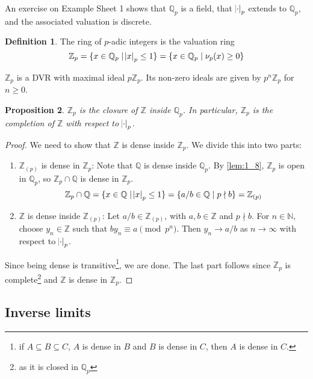 \documentclass[12pt]{amsart}
\theoremstyle{definition}
\newtheorem{definition}{Definition}[section]
\theoremstyle{plain}
\newtheorem{proposition}[definition]{Proposition}
\theoremstyle{remark}
\newcommand{\bN}{\mathbb{N}}
\newcommand{\bZ}{\mathbb{Z}}
\newcommand{\bQ}{\mathbb{Q}}
\begin{document}
An exercise on Example Sheet 1 shows that $\bQ_p$ is a field, that $\abs{\cdot}_p$ extends to $\bQ_p$, and the associated valuation is discrete.

\begin{definition}
    The ring of $p$-adic integers is the valuation ring
    \begin{equation*}
        \bZ_p = \{x \in \bQ_p \mid \abs{x}_p \le 1\} = \{x \in \bQ_p \mid \nu_p(x) \ge 0\}
    \end{equation*}
\end{definition}

\noindent $\bZ_p$ is a DVR with maximal ideal $p \bZ_p$. Its non-zero ideals are given by $p^n \bZ_p$ for $n \ge 0$.

\begin{proposition}\label{prop:3_2}
    $\bZ_p$ is the closure of $\bZ$ inside $\bQ_p$. In particular, $\bZ_p$ is the completion of $\bZ$ with respect to $\abs{\cdot}_p$.
\end{proposition}
\begin{proof}
    We need to show that $\bZ$ is dense inside $\bZ_p$. We divide this into two parts:
    \begin{enumerate}
        \item $\bZ_{(p)}$ is dense in $\bZ_p$: Note that $\bQ$ is dense inside $\bQ_p$. By \autoref{lem:1_8}, $\bZ_p$ is open in $\bQ_p$, so $\bZ_p \cap \bQ$ is dense in $\bZ_p$.
            \begin{equation*}
                \bZ_p \cap \bQ = \{x \in \bQ \mid \abs{x}_p \le 1\} = \{a/b \in \bQ \mid p \nmid b\} = \bZ_{(p)}
            \end{equation*}
        \item $\bZ$ is dense inside $\bZ_{(p)}$:
    Let $a/b \in \bZ_{(p)}$, with $a, b \in \bZ$ and $p \nmid b$. For $n \in \bN$, choose $y_n \in \bZ$ such that $b y_n \equiv a \pmod{p^n}$. Then $y_n \to a/b$ as $n \to \infty$ with respect to $\abs{\cdot}_p$.
    \end{enumerate}
    Since being dense is transitive\footnote{if $A \subseteq B \subseteq C$, $A$ is dense in $B$ and $B$ is dense in $C$, then $A$ is dense in $C$.}, we are done. The last part follows since $\bZ_p$ is complete\footnote{as it is closed in $\bQ_p$} and $\bZ$ is dense in $\bZ_p$.
\end{proof}

\subsection*{Inverse limits}
\end{document}
